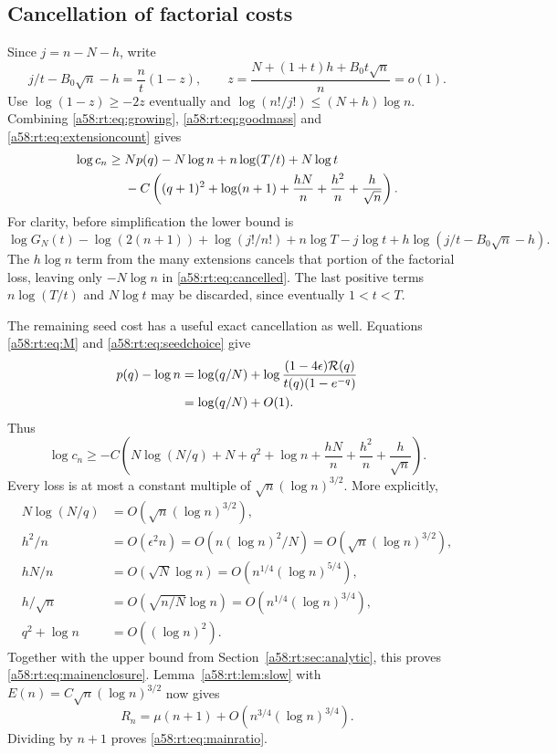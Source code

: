 \documentclass[11pt,letterpaper]{article}
\theoremstyle{remark}
\begin{document}
\subsection{Cancellation of factorial costs}
Since $j=n-N-h$, write
\begin{equation}\label{a58:rt:eq:z}
 j/t-B_0\sqrt n-h=\frac nt(1-z),\qquad
 z=\frac{N+(1+t)h+B_0t\sqrt n}{n}=o(1).
\end{equation}
Use $\log(1-z)\ge-2z$ eventually and
$\log(n!/j!)\le(N+h)\log n$. Combining
\eqref{a58:rt:eq:growing}, \eqref{a58:rt:eq:goodmass} and \eqref{a58:rt:eq:extensioncount}
gives
\begin{align}
 \log c_n\ge{}&Np(q)-N\log n+n\log(T/t)+N\log t\notag\\
 &-C\left((q+1)^2+\log(n+1)
             +\frac{hN}{n}+\frac{h^2}{n}+\frac h{\sqrt n}\right).
 \label{a58:rt:eq:cancelled}
\end{align}
For clarity, before simplification the lower bound is
\[
 \log G_N(t)-\log(2(n+1))+\log(j!/n!)
 +n\log T-j\log t+h\log(j/t-B_0\sqrt n-h).
\]
The $h\log n$ term from the many extensions cancels that portion of the
factorial loss, leaving only $-N\log n$ in \eqref{a58:rt:eq:cancelled}.
The last positive terms $n\log(T/t)$ and $N\log t$ may be discarded,
since eventually $1<t<T$.

The remaining seed cost has a useful exact cancellation as well.
Equations \eqref{a58:rt:eq:M} and \eqref{a58:rt:eq:seedchoice} give
\begin{align}
 p(q)-\log n
 &=\log(q/N)
 +\log\frac{(1-4\epsilon)\mathcal R(q)}{t(q)(1-e^{-q})}\notag\\
 &=\log(q/N)+O(1).\label{a58:rt:eq:seedcancel}
\end{align}
Thus
\begin{equation}\label{a58:rt:eq:losses}
 \log c_n\ge-C\left(N\log(N/q)+N+q^2+\log n
             +\frac{hN}{n}+\frac{h^2}{n}+\frac h{\sqrt n}\right).
\end{equation}
Every loss is at most a constant multiple of
$\sqrt n(\log n)^{3/2}$. More explicitly,
\begin{align*}
 N\log(N/q)&=O\!\left(\sqrt n(\log n)^{3/2}\right),\\
 h^2/n&=O(\epsilon^2n)
       =O\!\left(n(\log n)^2/N\right)
       =O\!\left(\sqrt n(\log n)^{3/2}\right),\\
 hN/n&=O(\sqrt N\log n)
       =O\!\left(n^{1/4}(\log n)^{5/4}\right),\\
 h/\sqrt n&=O\!\left(\sqrt{n/N}\log n\right)
       =O\!\left(n^{1/4}(\log n)^{3/4}\right),\\
 q^2+\log n&=O((\log n)^2).
\end{align*}
Together with the upper bound from Section~\ref{a58:rt:sec:analytic}, this proves
\eqref{a58:rt:eq:mainenclosure}. Lemma~\ref{a58:rt:lem:slow} with
$E(n)=C\sqrt n(\log n)^{3/2}$ now gives
\[
 R_n=\mu(n+1)+O\!\left(n^{3/4}(\log n)^{3/4}\right).
\]
Dividing by $n+1$ proves \eqref{a58:rt:eq:mainratio}.
\end{document}
